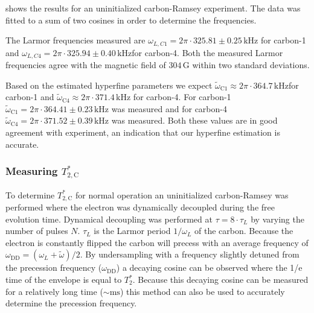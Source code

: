 shows the results for an uninitialized carbon-Ramsey experiment.
The data was fitted to a sum of two cosines in order to determine the frequencies.

The Larmor frequencies measured are $\omega_{L,C1} = 2\pi\cdot 325.81 \pm 0.25\, \mathrm{kHz}$  for carbon-1 and  $\omega_{L,C4} =  2\pi\cdot 325.94 \pm 0.40\, \mathrm{kHz}$for carbon-4.
Both the measured Larmor frequencies agree with the magnetic field of $304\, \mathrm{G}$ within two standard deviations.

Based on the estimated hyperfine parameters we expect $\tilde\omega_{\mathrm{C1}} \approx 2\pi\cdot 364.7\, \mathrm{kHz}$for carbon-1 and $\tilde \omega_{\mathrm{C4}} \approx 2\pi\cdot 371.4\, \mathrm{kHz}$ for carbon-4.
For carbon-1 $\tilde \omega_{\mathrm{C1}}= 2\pi\cdot 364.41 \pm 0.23\, \mathrm{kHz}$ was measured
and for carbon-4 $\tilde \omega_{\mathrm{C4}} = 2\pi\cdot 371.52 \pm 0.39 \, \mathrm{kHz}$ was measured.
Both these values are in good agreement with experiment, an indication that our hyperfine estimation is accurate.


\subsubsection{Measuring $T_{2,\mathrm{C}}^* $}
To determine $T_{2,\mathrm{C}}^* $ for normal operation an uninitialized carbon-Ramsey was performed where the electron was dynamically decoupled during the free evolution time.
Dynamical decoupling was performed at $\tau = 8\cdot \tau_L$ by varying the number of pulses $N$. $\tau_L$ is the Larmor period $1/\omega_L$ of the carbon.
Because the electron is constantly flipped the carbon will precess with an average frequency of $\omega_{\mathrm{DD}} = (\omega_L +\tilde{\omega} )/2$.
By undersampling with a frequency slightly detuned from the precession frequency ($\omega_{\mathrm{DD}}$) a decaying cosine can be observed where the 1/e time of the envelope is equal to $T_2^*$.
Because this decaying cosine can be measured for a relatively long time ($\sim \mathrm{ms}$) this method can also be used to accurately determine the precession frequency.


